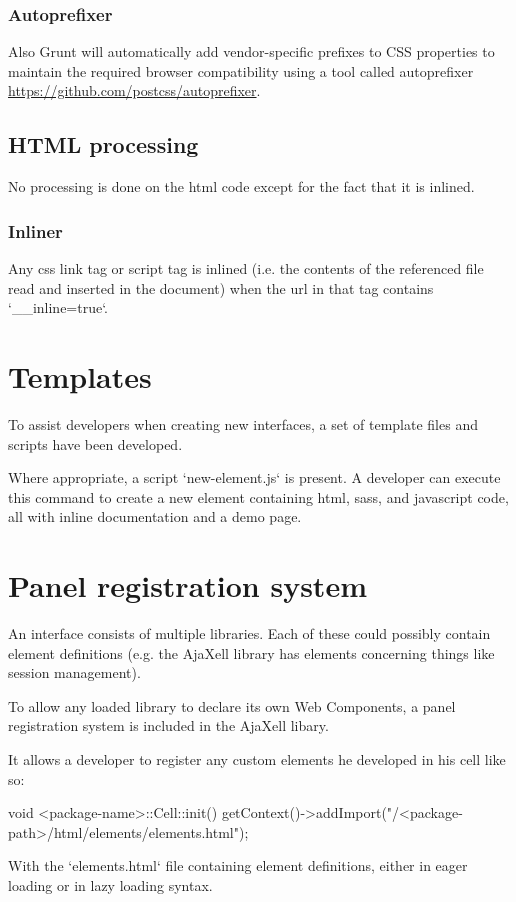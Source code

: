 \subsubsection{Autoprefixer}
Also Grunt will automatically add vendor-specific prefixes to CSS properties to
maintain the required browser compatibility using a tool called autoprefixer
\url{https://github.com/postcss/autoprefixer}.
\subsection{HTML processing}
No processing is done on the html code except for the fact that it is inlined.
\subsubsection{Inliner}
Any css link tag or script tag is inlined (i.e. the contents of the referenced
file read and inserted in the document) when the url in that tag contains
`\_\_inline=true`.

\section{Templates}
To assist developers when creating new interfaces, a set of template files and
scripts have been developed.

Where appropriate, a script `new-element.js` is present. A developer can execute
this command to create a new element containing html, sass, and javascript code,
all with inline documentation and a demo page.

\section{Panel registration system}
An interface consists of multiple libraries. Each of these could possibly contain
element definitions (e.g. the AjaXell library has elements concerning things like
session management).

To allow any loaded library to declare its own Web Components, a panel
registration system is included in the AjaXell libary.

It allows a developer to register any custom elements he developed in his cell
like so:
\begin{pyglist}[language=cpp,numbers=left,numbersep=5pt,fontsize=\small]
void <package-name>::Cell::init()
{
  getContext()->addImport("/<package-path>/html/elements/elements.html");
}
\end{pyglist}
With the `elements.html` file containing element definitions, either in eager
loading or in lazy loading syntax.

